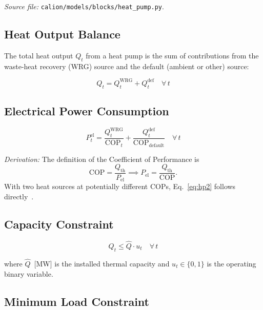 \documentclass[a4paper,12pt]{article}
\newcommand{\COP}{\mathrm{COP}}
\begin{document}
\textit{Source file:} \texttt{calion/models/blocks/heat\_pump.py}.

\subsection{Heat Output Balance}

The total heat output $Q_{t}$ from a heat pump is the sum of contributions from the
waste-heat recovery (WRG) source and the default (ambient or other) source:

\begin{equation}
  Q_{t} = Q^{\text{WRG}}_{t} + Q^{\text{def}}_{t}
  \quad \forall\, t
  \tag{HP-1}
  \label{eq:hp1}
\end{equation}

\subsection{Electrical Power Consumption}

\begin{equation}
  P^{\text{el}}_{t}
  = \frac{Q^{\text{WRG}}_{t}}{\COP_{t}}
    + \frac{Q^{\text{def}}_{t}}{\COP_{\text{default}}}
  \quad \forall\, t
  \tag{HP-2}
  \label{eq:hp2}
\end{equation}

\noindent\textit{Derivation:} The definition of the Coefficient of Performance is
\[
  \COP = \frac{Q_{\text{th}}}{P_{\text{el}}}
  \implies
  P_{\text{el}} = \frac{Q_{\text{th}}}{\COP}.
\]
With two heat sources at potentially different COPs, Eq.~\eqref{eq:hp2} follows
directly~\cite{Viessmann2021,Berghmans2012}.

\subsection{Capacity Constraint}

\begin{equation}
  Q_{t} \leq \hat{Q} \cdot u_{t}
  \quad \forall\, t
  \tag{HP-3}
  \label{eq:hp3}
\end{equation}

where $\hat{Q}$~[MW] is the installed thermal capacity and $u_{t} \in \{0,1\}$ is the
operating binary variable.

\subsection{Minimum Load Constraint}
\end{document}
